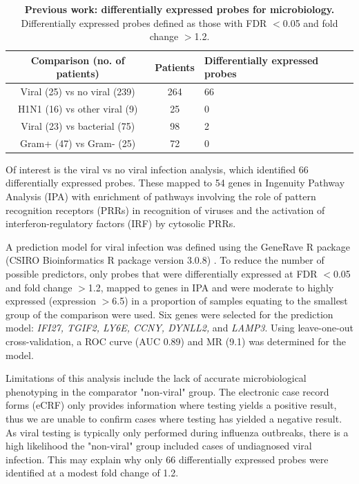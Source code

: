 \FloatBarrier
\begin{table}[]
\begin{center}
\begin{tabular}{|c|c|l|}
\hline
\textbf{Comparison (no. of patients)} & \textbf{Patients} & \textbf{Differentially expressed probes} \\ \hline
Viral (25) vs no viral (239)          & 264               & 66                                       \\ \hline
H1N1 (16) vs other viral (9)          & 25                & 0                                        \\ \hline
Viral (23) vs bacterial (75)          & 98                & 2                                        \\ \hline
Gram+ (47) vs Gram- (25)              & 72                & 0                                        \\ \hline
\end{tabular}

\end{center}
\smallskip
\caption[Previous work transcriptomic signatures for microbiology] {\textbf{Previous work: differentially expressed probes for microbiology.} Differentially expressed probes defined as those with FDR $<$0.05 and fold change $>$1.2.} 
\label{tab:emmaDEgenes}
\end{table}


Of interest is the viral vs no viral infection  analysis, which identified 66 differentially expressed probes. These mapped to 54 genes in Ingenuity Pathway Analysis (IPA) with enrichment of pathways involving the role of pattern recognition receptors (PRRs) in recognition of viruses and the activation of interferon-regulatory factors (IRF) by cytosolic PRRs.

A prediction model for viral infection was defined using the GeneRave R package (CSIRO Bioinformatics R package version 3.0.8) \parencite{Kiiveri2008}. To reduce the number of possible predictors, only probes that were differentially expressed at FDR $<$0.05 and fold change $>$1.2, mapped to genes in IPA and were moderate to highly expressed (expression $>$6.5) in a proportion of samples equating to the smallest group of the comparison were used. Six genes were selected for the prediction model: \textit{IFI27, TGIF2, LY6E, CCNY, DYNLL2,} and \textit{LAMP3}. Using leave-one-out cross-validation, a ROC curve (AUC 0.89) and MR (9.1) was determined for the model.

Limitations of this analysis include the lack of accurate microbiological phenotyping in the comparator "non-viral" group. The electronic case record forms (eCRF) only provides information where testing yields a positive result, thus we are unable to confirm cases where testing has yielded a negative result. As viral testing is typically only performed during influenza outbreaks, there is a high likelihood the "non-viral" group included cases of undiagnosed viral infection. This may explain why only 66 differentially expressed probes were identified at a modest fold change of 1.2. 


